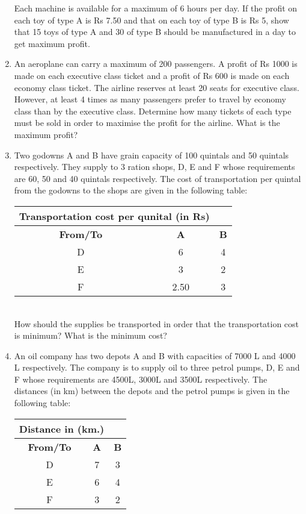 \begin{enumerate}[label=\arabic*.,ref=\thesubsection.\theenumi]
Each machine is available for a maximum of 6 hours per day. If the profit on
each toy of type A is Rs 7.50 and that on each toy of type B is Rs 5, show that 15
toys of type A and 30 of type B should be manufactured in a day to get maximum
profit.\\
\item An aeroplane can carry a maximum of 200 passengers. A profit of Rs 1000 is
made on each executive class ticket and a profit of Rs 600 is made on each
economy class ticket. The airline reserves at least 20 seats for executive class.
However, at least 4 times as many passengers prefer to travel by economy class
than by the executive class. Determine how many tickets of each type must be
sold in order to maximise the profit for the airline. What is the maximum profit?\\
\item Two godowns A and B have grain capacity of 100 quintals and 50 quintals
respectively. They supply to 3 ration shops, D, E and F whose requirements are
60, 50 and 40 quintals respectively. The cost of transportation per quintal from
the godowns to the shops are given in the following table:\\
\begin{tabular}{|c|c|c|}
\hline
 \multicolumn{2}{|l}{\textbf{ Transportation cost per qunital (in Rs)}}& \\ \cline{2-3}
\hline
\textbf {From/To}&\textbf{A}&\textbf{B}\\
\hline
D&6&4\\
\hline
 E&3&2\\
 \hline 
 F&2.50&3\\
 \hline

\end{tabular}\\


How should the supplies be transported in order that the transportation cost is
minimum? What is the minimum cost?\\
\item An oil company has two depots A and B with capacities of 7000 L and 4000 L
respectively. The company is to supply oil to three petrol pumps, D, E and F
whose requirements are 4500L, 3000L and 3500L respectively. The distances
(in km) between the depots and the petrol pumps is given in the following table:\\
\begin{tabular}{|c|c|c|}
\hline
 \multicolumn{2}{|l}{\textbf{Distance in (km.)}}& \\ \cline{2-3}
\hline
\textbf {From/To}&\textbf{A}&\textbf{B}\\
\hline
D&7&3\\
\hline
 E&6&4\\
 \hline 
 F&3&2\\
 \hline


\end{tabular}
\end{enumerate}
